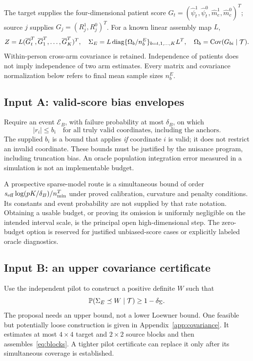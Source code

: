 The target supplies the four-dimensional patient score
$G_t=(\widehat\psi_t^1,\widehat\psi_t^0,
\widehat m_c^1,\widehat m_c^0)^T$; source $j$ supplies
$G_j=(R_j^1,R_j^0)^T$. For a known linear assembly map $L$,
\begin{equation}
 Z=L(\overline G_t^T,\overline G_1^T,\ldots,\overline G_K^T)^T,
 \quad \Sigma_E=L\operatorname{diag}\{\Omega_b/n_b^E\}_{b=t,1,\ldots,K}L^T,
 \quad \Omega_b=\operatorname{Cov}(G_{bi}\mid\mathcal T).\label{eq:blocks}
\end{equation}
Within-person cross-arm covariance is retained. Independence of patients
does not imply independence of two arm estimates. Every matrix and covariance
normalization below refers to final mean sample sizes $n_b^E$.

\subsection{Input A: valid-score bias envelopes}
Require an event $\mathcal E_B$, with failure probability at most $\delta_B$,
on which
\begin{equation}
 |r_i|\le b_i\quad\text{for all truly valid coordinates, including the anchors}.
 \label{eq:bias-event}
\end{equation}
The supplied $b_i$ is a bound that applies \emph{if} coordinate $i$ is valid;
it does not restrict an invalid coordinate. These bounds must be justified by
the nuisance program, including truncation bias. An oracle population
integration error measured in a simulation is not an implementable budget.

A prospective sparse-model route is a simultaneous bound of order
$s_{\rm eff}\log(pK/\delta_B)/n^T_{\min}$ under proved calibration, curvature
and penalty conditions. Its constants and event probability are not supplied
by that rate notation. Obtaining a usable budget, or proving its omission is
uniformly negligible on the intended interval scale, is the principal open
high-dimensional step. The zero-budget option is reserved for justified
unbiased-score cases or explicitly labeled oracle diagnostics.

\subsection{Input B: an upper covariance certificate}
Use the independent pilot to construct a positive definite $W$ such that
\begin{equation}
 \mathbb P(\Sigma_E\preceq W\mid\mathcal T)\ge1-\delta_\Sigma.
 \label{eq:cov-event}
\end{equation}
The proposal needs an upper bound, not a lower Loewner bound. One feasible
but potentially loose construction is given in Appendix~\ref{app:covariance}.
It estimates at most $4\times4$ target and $2\times2$ source blocks and then
assembles~\eqref{eq:blocks}. A tighter pilot certificate can replace it only
after its simultaneous coverage is established.

